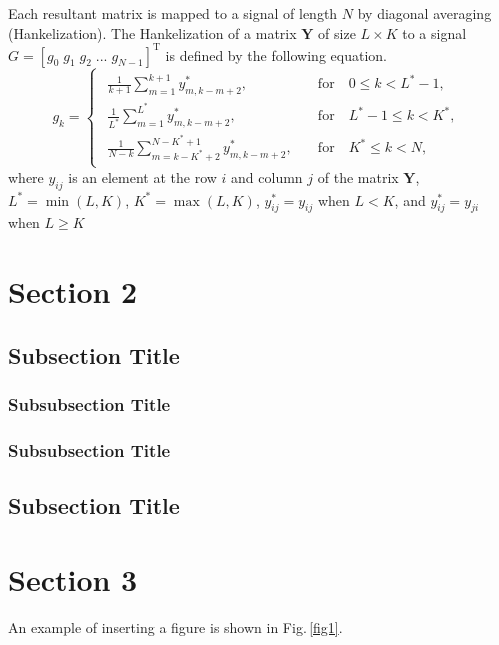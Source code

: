 \documentclass[conference,a4paper]{IEEEtran}
\begin{document}
Each resultant matrix is mapped to a signal of length $N$ by diagonal averaging (Hankelization). The Hankelization of a matrix $\mathbf{Y}$ of size $L\!\times\!K$ to a signal $G\!=\![g_0 \; g_1 \; g_2 \; ... \; g_{N-1}]^\textrm{T}$ is defined by the following equation.
\begin{equation}
g_k =\left\{
\begin{array}{ll}
    \begin{array}{ll}
      \frac{1}{k+1}\displaystyle\sum_{m=1}^{k+1}y^*_{m,k-m+2}, & \quad\textrm{for} \quad 0 \leq k < L^*\!-\!1, \\
      \frac{1}{L^*}\displaystyle\sum_{m=1}^{L^*}y^*_{m,k-m+2}, & \quad\textrm{for} \quad L^*\!-\!1 \leq k < K^*, \\
      \frac{1}{N-k}\displaystyle\sum_{m=k-K^*+2}^{N-K^*+1}y^*_{m,k-m+2}, & \quad\textrm{for} \quad K^* \leq k < N,
    \end{array}
\end{array}
\right.
\label{eq4}
\end{equation}
where $y_{i\!j}$ is an element at the row $i$ and column $j$ of the matrix $\mathbf{Y}$, $L^* \!=\!\min(L,K)$, $K^*\!=\!\max(L,K)$, $y^*_{i\!j}\!=\!y_{i\!j}$ when $L\!<\!K$, and $y^*_{i\!j}\!=\!y_{\!j\!i}$ when $L\!\geq\!K$

\section{Section 2}
\subsection{Subsection Title}
\subsubsection{Subsubsection Title}
\subsubsection{Subsubsection Title}
\subsection{Subsection Title}

\section{Section 3}

An example of inserting a figure is shown in Fig.\,\ref{fig1}.
\end{document}
